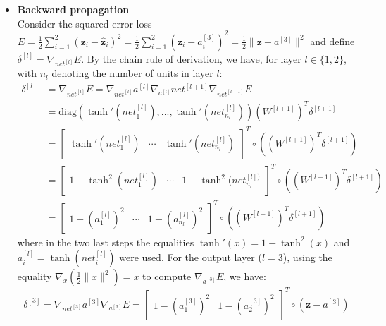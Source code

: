 \documentclass{exam}
\begin{document}
\begin{questions}
\begin{itemize}
            \item \textbf{Backward propagation} \\
            Consider the squared error loss $E = \frac{1}{2}\sum_{i = 1}^{2} (\mathbf{z}_i - \mathbf{\hat{z}}_i)^2 = \frac{1}{2}\sum_{i = 1}^{2} \left(\mathbf{z}_i - a_i^{[3]}\right)^2 =  \frac{1}{2}\| \mathbf{z} - a^{[3]}\|^2$ and define $\delta^{[l]} = \nabla_{net^{[l]}} E$. By the chain rule of derivation, we have, for layer $l \in \{1, 2\}$, with $n_l$ denoting the number of units in layer $l$:
            \begin{align}
                \delta^{[l]}& = \nabla_{net^{[l]}} E = \nabla_{net^{[l]}} a^{[l]} \nabla_{a^{[l]}} net^{[l+1]} \nabla_{net^{[l+1]}} E  \nonumber \\
                &= \text{diag}(\tanh'(net^{[l]}_1), ..., \tanh'(net^{[l]}_{n_l}))(W^{[l + 1]})^T\delta^{[l + 1]} \nonumber \\
                &= 
                \begin{bmatrix}
                    \tanh'(net^{[l]}_1) & \cdots & \tanh'(net^{[l]}_{n_l})
                \end{bmatrix}^T \circ \left((W^{[l + 1]})^T\delta^{[l + 1]}\right) \nonumber \\
                &= \begin{bmatrix}
                    1 - \tanh^2(net^{[l]}_1) & \cdots &  1 - \tanh^2(net^{[l])}_{n_l}
                \end{bmatrix}^T \circ \left((W^{[l + 1]})^T\delta^{[l + 1]}\right) \nonumber \\
                &= \begin{bmatrix}
                    1 - (a^{[l]}_1)^2 & \cdots &  1 - (a^{[l]}_{n_l})^2
                \end{bmatrix}^T \circ \left((W^{[l + 1]})^T\delta^{[l + 1]}\right) \label{eq:1}
            \end{align}
            where in the two last steps the equalities $\tanh'(x) = 1 - \tanh^2(x)$ and $a^{[l]}_i = \tanh(net^{[l]}_i)$ were used. For the output layer ($l = 3$), using the equality $\nabla_x \left(\frac{1}{2}\|x\|^2\right) = x$ to compute $\nabla_{a^{[3]}}{E}$, we have:
            \begin{equation}
                \delta^{[3]} = \nabla_{net^{[3]}}{a^{[3]}} \nabla_{a^{[3]}}{E} = 
                \begin{bmatrix}
                    1 - (a^{[3]}_1)^2 &   1 - (a^{[3]}_{2})^2
                \end{bmatrix}^T \circ (\mathbf{z} - a^{[3]})

\end{equation}
\end{itemize}
\end{questions}
\end{document}
